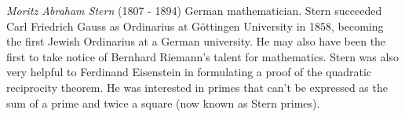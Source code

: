 \documentclass[12pt]{article}
\begin{document}
\emph{Moritz Abraham Stern} (1807 - 1894) German mathematician. Stern succeeded Carl Friedrich Gauss as Ordinarius at G\"ottingen University in 1858, becoming the first Jewish Ordinarius at a German university. He may also have been the first to take notice of Bernhard Riemann's talent for mathematics. Stern was also very helpful to Ferdinand Eisenstein in formulating a proof of the quadratic reciprocity theorem. He was interested in primes that can't be expressed as the sum of a prime and twice a square (now known as Stern primes).
\end{document}
